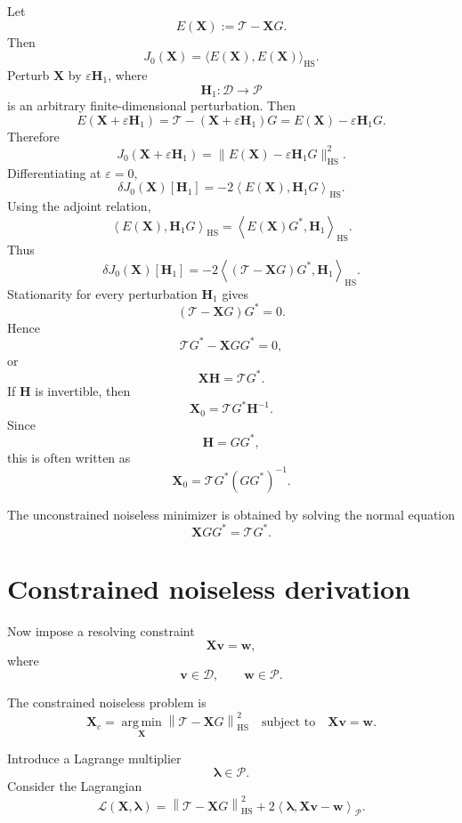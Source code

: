 \documentclass[11pt,openany]{book}
\theoremstyle{definition}
\theoremstyle{remark}
\newcommand{\D}{\mathcal D}
\newcommand{\Pspace}{\mathcal P}
\newcommand{\Tau}{\mathcal{T}}
\newcommand{\HS}{\mathrm{HS}}
\newcommand{\argmin}{\operatorname*{arg\,min}}
\begin{document}
Let
\[
  E(\mathbf X):=\Tau-\mathbf XG.
\]
Then
\[
  J_0(\mathbf X)
  =
  \langle E(\mathbf X),E(\mathbf X)\rangle_{\HS}.
\]
Perturb \(\mathbf X\) by \(\varepsilon\mathbf H_1\), where
\[
  \mathbf H_1:\D\to\Pspace
\]
is an arbitrary finite-dimensional perturbation. Then
\[
  E(\mathbf X+\varepsilon\mathbf H_1)
  =
  \Tau-(\mathbf X+\varepsilon\mathbf H_1)G
  =
  E(\mathbf X)-\varepsilon\mathbf H_1G.
\]
Therefore
\[
  J_0(\mathbf X+\varepsilon\mathbf H_1)
  =
  \|E(\mathbf X)-\varepsilon\mathbf H_1G\|_{\HS}^2.
\]
Differentiating at \(\varepsilon=0\),
\[
  \delta J_0(\mathbf X)[\mathbf H_1]
  =
  -2
  \left\langle
    E(\mathbf X),
    \mathbf H_1G
  \right\rangle_{\HS}.
\]
Using the adjoint relation,
\[
  \left\langle
    E(\mathbf X),
    \mathbf H_1G
  \right\rangle_{\HS}
  =
  \left\langle
    E(\mathbf X)G^*,
    \mathbf H_1
  \right\rangle_{\HS}.
\]
Thus
\[
  \delta J_0(\mathbf X)[\mathbf H_1]
  =
  -2
  \left\langle
    (\Tau-\mathbf XG)G^*,
    \mathbf H_1
  \right\rangle_{\HS}.
\]
Stationarity for every perturbation \(\mathbf H_1\) gives
\[
  (\Tau-\mathbf XG)G^*=0.
\]
Hence
\[
  \Tau G^*-\mathbf XGG^*=0,
\]
or
\[
  \mathbf X\mathbf H=\Tau G^*.
\]
If \(\mathbf H\) is invertible, then
\[
  \boxed{
    \mathbf X_0=\Tau G^*\mathbf H^{-1}.
  }
\]
Since
\[
  \mathbf H=GG^*,
\]
this is often written as
\[
  \mathbf X_0
  =
  \Tau G^*(GG^*)^{-1}.
\]

\begin{checkpointbox}
The unconstrained noiseless minimizer is obtained by solving the normal equation
\[
  \mathbf XGG^*=\Tau G^*.
\]
\end{checkpointbox}

\section{Constrained noiseless derivation}

Now impose a resolving constraint
\[
  \mathbf X\mathbf v=\mathbf w,
\]
where
\[
  \mathbf v\in\D,
  \qquad
  \mathbf w\in\Pspace.
\]

The constrained noiseless problem is
\[
  \mathbf X_c
  =
  \argmin_{\mathbf X}
  \left\|
    \Tau-\mathbf XG
  \right\|_{\HS}^2
  \quad
  \text{subject to}
  \quad
  \mathbf X\mathbf v=\mathbf w.
\]

Introduce a Lagrange multiplier
\[
  \boldsymbol\lambda\in\Pspace.
\]
Consider the Lagrangian
\[
  \mathcal L(\mathbf X,\boldsymbol\lambda)
  =
  \left\|
    \Tau-\mathbf XG
  \right\|_{\HS}^2
  +
  2
  \left\langle
    \boldsymbol\lambda,
    \mathbf X\mathbf v-\mathbf w
  \right\rangle_{\Pspace}.
\]
\end{document}
